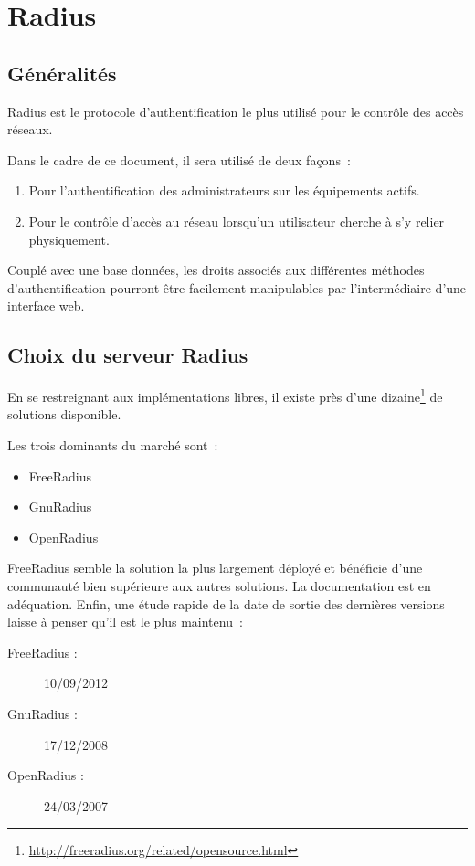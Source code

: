 \section{Radius}
\subsection{Généralités}

Radius est le protocole d'authentification le plus utilisé pour le contrôle des accès réseaux.

Dans le cadre de ce document, il sera utilisé de deux façons~:

\begin{enumerate}
\item Pour l'authentification des administrateurs sur les équipements actifs.
\item Pour le contrôle d'accès au réseau lorsqu'un utilisateur cherche à s'y relier physiquement.
\end{enumerate}

Couplé avec une base données, les droits associés aux différentes méthodes d'authentification pourront être facilement manipulables par l'intermédiaire d'une interface web.

\subsection{Choix du serveur Radius}

En se restreignant aux implémentations libres, il existe près d'une dizaine\footnote{\url{http://freeradius.org/related/opensource.html}} de solutions disponible.

Les trois dominants du marché sont~:
\begin{itemize}
\item FreeRadius
\item GnuRadius
\item OpenRadius
\end{itemize}

FreeRadius semble la solution la plus largement déployé et bénéficie d'une communauté bien supérieure aux autres solutions. La documentation est en adéquation. Enfin, une étude rapide de la date de sortie des dernières versions laisse à penser qu'il est le plus maintenu~:

\begin{description}
\item[FreeRadius :] 10/09/2012
\item[GnuRadius :] 17/12/2008
\item[OpenRadius :] 24/03/2007
\end{description}

